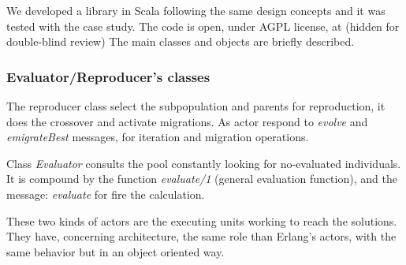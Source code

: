 
We developed a library in Scala following the same design concepts and it was tested with the case study. The code is open, under AGPL license, at 
(hidden for double-blind review)
The main classes and objects are briefly described.


\subsubsection{Evaluator/Reproducer's classes}

The reproducer class select the subpopulation and parents for reproduction, it does the crossover and activate migrations. As actor respond to {\em evolve} and {\em emigrateBest} messages, for iteration and migration operations.


Class {\em Evaluator} consults the pool constantly looking for no-evaluated individuals. It is compound by the function {\em evaluate/1} (general evaluation function), and the message: {\em evaluate} for fire the calculation.

These two kinds of actors are the executing units working to reach the solutions. They have, concerning architecture, the same role than Erlang’s actors, with the same behavior but in an object oriented way.
